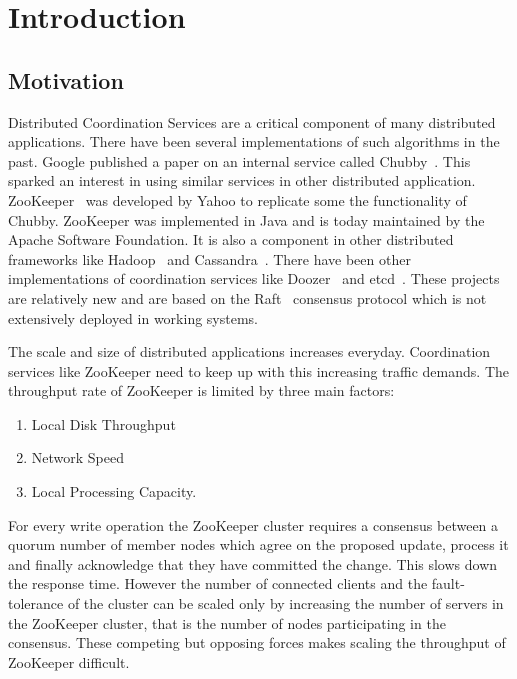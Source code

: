 \chapter{Introduction}

\section{Motivation}

Distributed Coordination Services are a critical component of many distributed applications. There have been several implementations of such algorithms in the past. Google published a paper on an internal service called Chubby~\cite{burrows2006chubby}. This sparked an interest in using similar services in other distributed application. ZooKeeper~\cite{hunt2010zookeeper} was developed by Yahoo to replicate some the functionality of Chubby. ZooKeeper was implemented in Java and is today maintained by the Apache Software Foundation. It is also a component in other distributed frameworks like Hadoop~\cite{white2009hadoop} and Cassandra~\cite{lakshman2010cassandra}. There have been other implementations of coordination services like Doozer~\cite{ketelsen2015doozerd} and etcd~\cite{coreos2015etcd}. These projects are relatively new and are based on the Raft~\cite{ongaro2013search} consensus protocol which is not extensively deployed in working systems. 

The scale and size of distributed applications increases everyday. Coordination services like ZooKeeper need to keep up with this increasing traffic demands. The throughput rate of ZooKeeper is limited by three main factors:

\begin{enumerate}
	\item Local Disk Throughput
	\item Network Speed
	\item Local Processing Capacity.
\end{enumerate}

For every write operation the ZooKeeper cluster requires a consensus between a quorum number of member nodes which agree on the proposed update, process it and finally acknowledge that they have committed the change. This slows down the response time. However the number of connected clients and the fault-tolerance of the cluster can be scaled only by increasing the number of servers in the ZooKeeper cluster, that is the number of nodes participating in the consensus. These competing but opposing forces makes scaling the throughput of ZooKeeper difficult. 

